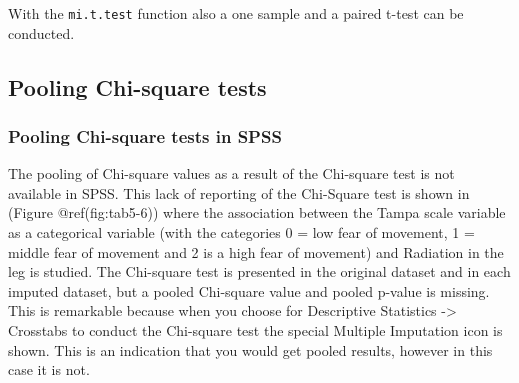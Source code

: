 \documentclass[
]{book}
\begin{document}
With the \texttt{mi.t.test} function also a one sample and a paired
t-test can be conducted.

\hypertarget{pooling-chi-square-tests}{%
\subsection{Pooling Chi-square tests}\label{pooling-chi-square-tests}}

\hypertarget{pooling-chi-square-tests-in-spss}{%
\subsubsection{Pooling Chi-square tests in
SPSS}\label{pooling-chi-square-tests-in-spss}}

The pooling of Chi-square values as a result of the Chi-square test is
not available in SPSS. This lack of reporting of the Chi-Square test is
shown in (Figure @ref(fig:tab5-6)) where the association between the
Tampa scale variable as a categorical variable (with the categories 0 =
low fear of movement, 1 = middle fear of movement and 2 is a high fear
of movement) and Radiation in the leg is studied. The Chi-square test is
presented in the original dataset and in each imputed dataset, but a
pooled Chi-square value and pooled p-value is missing. This is
remarkable because when you choose for Descriptive Statistics
-\textgreater{} Crosstabs to conduct the Chi-square test the special
Multiple Imputation icon is shown. This is an indication that you would
get pooled results, however in this case it is not.
\end{document}
